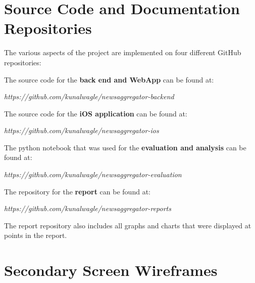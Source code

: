 \documentclass[12pt]{article}
\begin{document}
\begin{appendices}


\section{Source Code and Documentation Repositories}

The various aspects of the project are implemented on four different GitHub repositories:

The source code for the \textbf{back end and WebApp} can be found at:

\begin{displayquote}\emph{
https://github.com/kunalwagle/newsaggregator-backend\\}
\end{displayquote}

The source code for the \textbf{iOS application} can be found at:

\begin{displayquote}\emph{
https://github.com/kunalwagle/newsaggregator-ios\\}
\end{displayquote}

The python notebook that was used for the \textbf{evaluation and analysis} can be found at:

\begin{displayquote}\emph{
https://github.com/kunalwagle/newsaggregator-evaluation\\}
\end{displayquote}

The repository for the \textbf{report} can be found at:

\begin{displayquote}\emph{
https://github.com/kunalwagle/newsaggregator-reports\\}
\end{displayquote}

The report repository also includes all graphs and charts that were displayed at points in the report. 


\newpage

\section{Secondary Screen Wireframes}


\end{appendices}
\end{document}
